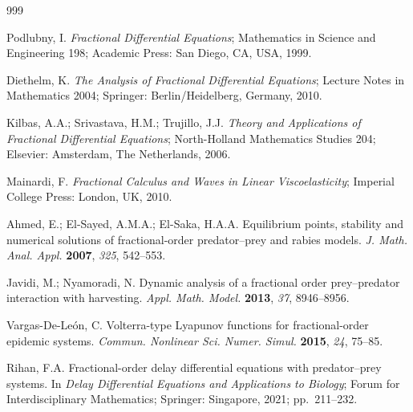 \documentclass[mathematics,article,accept,pdftex,moreauthors]{Definitions/mdpi}
\begin{document}
\vspace{6pt}





\begin{thebibliography}{999}

 Podlubny, I. \textit{Fractional Differential Equations}; Mathematics in Science and Engineering 198; Academic Press: San Diego, CA, USA, 1999.

 Diethelm, K. \textit{The Analysis of Fractional Differential Equations}; Lecture Notes in Mathematics 2004; Springer: Berlin/Heidelberg, Germany, 2010.

 Kilbas, A.A.; Srivastava, H.M.; Trujillo, J.J. \textit{Theory and Applications of Fractional Differential Equations}; North-Holland Mathematics Studies 204; Elsevier: Amsterdam, The Netherlands, 2006.

 Mainardi, F. \textit{Fractional Calculus and Waves in Linear Viscoelasticity}; Imperial College Press: London, UK, 2010.

 Ahmed, E.; El-Sayed, A.M.A.; El-Saka, H.A.A. Equilibrium points, stability and numerical solutions of fractional-order predator--prey and rabies models. \textit{J. Math. Anal. Appl.} \textbf{2007}, \emph{325}, 542--553.

 Javidi, M.; Nyamoradi, N. Dynamic analysis of a fractional order prey--predator interaction with harvesting. \textit{Appl. Math. Model.} \textbf{2013}, \emph{37}, 8946--8956.

 Vargas-De-Le\'on, C. Volterra-type Lyapunov functions for fractional-order epidemic systems. \textit{Commun. Nonlinear Sci. Numer. Simul.} \textbf{2015}, \emph{24}, 75--85.

 Rihan, F.A. Fractional-order delay differential equations with predator--prey systems. In \textit{Delay Differential Equations and Applications to Biology}; Forum for Interdisciplinary Mathematics; Springer: Singapore, 2021; pp.~211--232.


\end{thebibliography}
\end{document}
